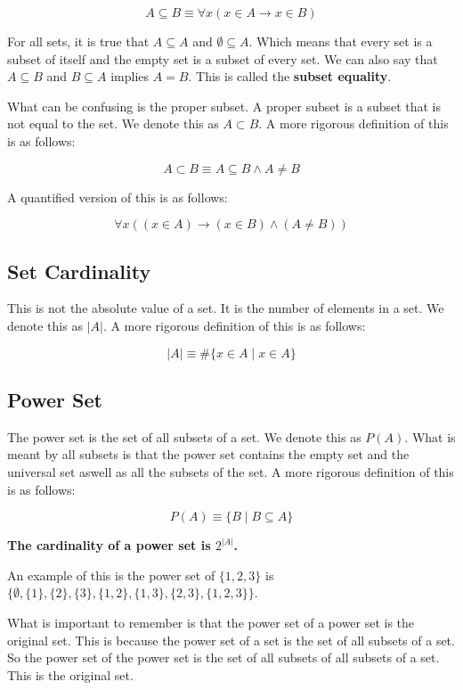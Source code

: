 \documentclass[11pt]{article}
\begin{document}
\[
A \subseteq B \equiv \forall x (x \in A \to x \in B)
\]

For all sets, it is true that \(A \subseteq A\) and \(\emptyset \subseteq A\). Which means that every set is a subset of itself and the empty set is a subset of every set. We can also say that \(A \subseteq B\) and \(B \subseteq A\) implies \(A = B\). This is called the \textbf{subset equality}.

What can be confusing is the proper subset. A proper subset is a subset that is not equal to the set. We denote this as \(A \subset B\). A more rigorous definition of this is as follows:

\[
A \subset B \equiv A \subseteq B \land A \neq B
\]

A quantified version of this is as follows:

\[
\forall x ((x \in A) \to (x \in B) \land (A \neq B))
\]

\subsection{Set Cardinality}
\label{sec:org327b457}
This is not the absolute value of a set. It is the number of elements in a set. We denote this as \(|A|\). A more rigorous definition of this is as follows:

\[
\vert A \vert \equiv \# \{x \in A \mid x \in A\}
\]

\subsection{Power Set}
\label{sec:orgc199818}
The power set is the set of all subsets of a set. We denote this as \(P(A)\). What is meant by all subsets is that the power set contains the empty set and the universal set aswell as all the subsets of the set. A more rigorous definition of this is as follows:

\[
P(A) \equiv \{B \mid B \subseteq A\}
\]

\textbf{The cardinality of a power set is \(2^{|A|}\).}

An example of this is the power set of \(\{1,2,3\}\) is \(\{\emptyset, \{1\}, \{2\}, \{3\}, \{1,2\}, \{1,3\}, \{2,3\}, \{1,2,3\}\}\).

What is important to remember is that the power set of a power set is the original set. This is because the power set of a set is the set of all subsets of a set. So the power set of the power set is the set of all subsets of all subsets of a set. This is the original set.
\end{document}
